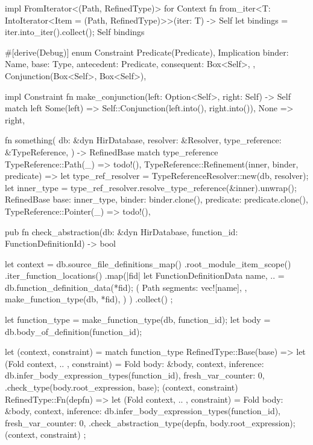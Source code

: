 \documentclass[
  oneside,
  english,
  coorientadorbanca,
  noabntexcite
]{ufsc-thesis-rn46-2019}
\begin{document}
\begin{rustcode}
impl FromIterator<(Path, RefinedType)> for Context {
    fn from_iter<T: IntoIterator<Item = (Path, RefinedType)>>(iter: T) -> Self {
        let bindings = iter.into_iter().collect();
        Self { bindings }
    }
}

#[derive(Debug)]
enum Constraint {
    Predicate(Predicate),
    Implication {
        binder: Name,
        base: Type,
        antecedent: Predicate,
        consequent: Box<Self>,
    },
    Conjunction(Box<Self>, Box<Self>),
}

impl Constraint {
    fn make_conjunction(left: Option<Self>, right: Self) -> Self {
        match left {
            Some(left) => Self::Conjunction(left.into(), right.into()),
            None => right,
        }
    }
}

fn something(
    db: &dyn HirDatabase,
    resolver: &Resolver,
    type_reference: &TypeReference,
) -> RefinedBase {
    match type_reference {
        TypeReference::Path(_) => todo!(),
        TypeReference::Refinement(inner, binder, predicate) => {
            let type_ref_resolver = TypeReferenceResolver::new(db, resolver);
            let inner_type = type_ref_resolver.resolve_type_reference(&inner).unwrap();
            RefinedBase {
                base: inner_type,
                binder: binder.clone(),
                predicate: predicate.clone(),
            }
        }
        TypeReference::Pointer(_) => todo!(),
    }
}

pub fn check_abstraction(db: &dyn HirDatabase, function_id: FunctionDefinitionId) -> bool {
    let context = {
        db.source_file_definitions_map()
            .root_module_item_scope()
            .iter_function_locations()
            .map(|fid| {
                let FunctionDefinitionData { name, .. } = db.function_definition_data(*fid);
                (
                    Path {
                        segments: vec![name],
                    },
                    make_function_type(db, *fid),
                )
            })
            .collect()
    };

    let function_type = make_function_type(db, function_id);
    let body = db.body_of_definition(function_id);

    let (context, constraint) = match function_type {
        RefinedType::Base(base) => {
            let (Fold { context, .. }, constraint) = Fold {
                body: &body,
                context,
                inference: db.infer_body_expression_types(function_id),
                fresh_var_counter: 0,
            }
            .check_type(body.root_expression, base);
            (context, constraint)
        }
        RefinedType::Fn(depfn) => {
            let (Fold { context, .. }, constraint) = Fold {
                body: &body,
                context,
                inference: db.infer_body_expression_types(function_id),
                fresh_var_counter: 0,
            }
            .check_abstraction_type(depfn, body.root_expression);
            (context, constraint)
        }
    };

}
\end{rustcode}
\end{document}
